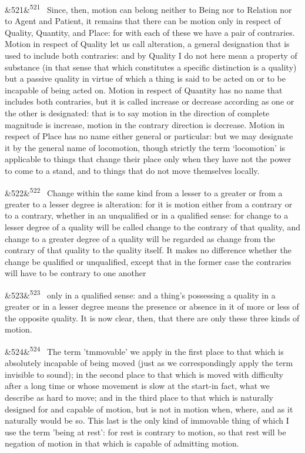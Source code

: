 \documentclass[12pt]{article}
\newcommand{\para}[1][]{\par\noindent\ifx&#1&\else\textsuperscript{\footnotesize #1}~\fi}
\begin{document}
\para[521] Since, then, motion can belong neither to Being nor to Relation nor to Agent and Patient, it remains that there can be motion only in respect of Quality, Quantity, and Place: for with each of these we have a pair of contraries. Motion in respect of Quality let us call alteration, a general designation that is used to include both contraries: and by Quality I do not here mean a property of substance (in that sense that which constitutes a specific distinction is a quality) but a passive quality in virtue of which a thing is said to be acted on or to be incapable of being acted on. Motion in respect of Quantity has no name that includes both contraries, but it is called increase or decrease according as one or the other is designated: that is to say motion in the direction of complete magnitude is increase, motion in the contrary direction is decrease. Motion in respect of Place has no name either general or particular: but we may designate it by the general name of locomotion, though strictly the term ‘locomotion’ is applicable to things that change their place only when they have not the power to come to a stand, and to things that do not move themselves locally.

\para[522] Change within the same kind from a lesser to a greater or from a greater to a lesser degree is alteration: for it is motion either from a contrary or to a contrary, whether in an unqualified or in a qualified sense: for change to a lesser degree of a quality will be called change to the contrary of that quality, and change to a greater degree of a quality will be regarded as change from the contrary of that quality to the quality itself. It makes no difference whether the change be qualified or unqualified, except that in the former case the contraries will have to be contrary to one another

\para[523] only in a qualified sense: and a thing's possessing a quality in a greater or in a lesser degree means the presence or absence in it of more or less of the opposite quality. It is now clear, then, that there are only these three kinds of motion.

\para[524] The term 'tmmovable' we apply in the first place to that which is absolutely incapable of being moved (just as we correspondingly apply the term invisible to sound); in the second place to that which is moved with difficulty after a long time or whose movement is slow at the start-in fact, what we describe as hard to move; and in the third place to that which is naturally designed for and capable of motion, but is not in motion when, where, and as it naturally would be so. This last is the only kind of immovable thing of which I use the term 'being at rest': for rest is contrary to motion, so that rest will be negation of motion in that which is capable of admitting motion.
\end{document}

